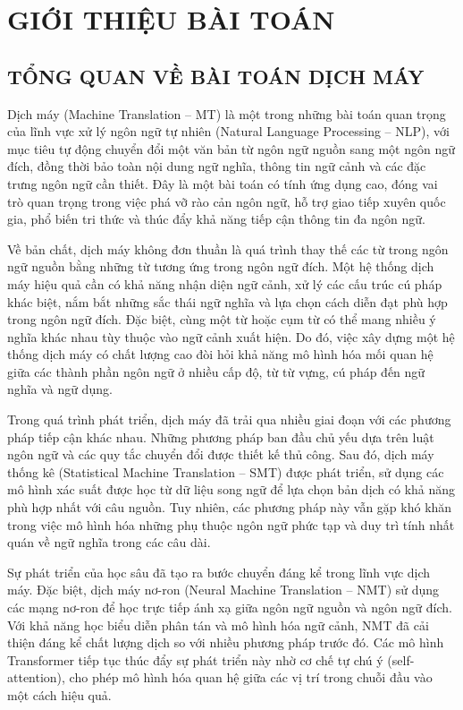 
\section{GIỚI THIỆU BÀI TOÁN}
\label{chap:introduction}

\subsection{TỔNG QUAN VỀ BÀI TOÁN DỊCH MÁY}
\label{sec:machine_translation_overview}

Dịch máy (Machine Translation -- MT) là một trong những bài toán quan trọng của lĩnh vực xử lý ngôn ngữ tự nhiên (Natural Language Processing -- NLP), với mục tiêu tự động chuyển đổi một văn bản từ ngôn ngữ nguồn sang một ngôn ngữ đích, đồng thời bảo toàn nội dung ngữ nghĩa, thông tin ngữ cảnh và các đặc trưng ngôn ngữ cần thiết. Đây là một bài toán có tính ứng dụng cao, đóng vai trò quan trọng trong việc phá vỡ rào cản ngôn ngữ, hỗ trợ giao tiếp xuyên quốc gia, phổ biến tri thức và thúc đẩy khả năng tiếp cận thông tin đa ngôn ngữ.

Về bản chất, dịch máy không đơn thuần là quá trình thay thế các từ trong ngôn ngữ nguồn bằng những từ tương ứng trong ngôn ngữ đích. Một hệ thống dịch máy hiệu quả cần có khả năng nhận diện ngữ cảnh, xử lý các cấu trúc cú pháp khác biệt, nắm bắt những sắc thái ngữ nghĩa và lựa chọn cách diễn đạt phù hợp trong ngôn ngữ đích. Đặc biệt, cùng một từ hoặc cụm từ có thể mang nhiều ý nghĩa khác nhau tùy thuộc vào ngữ cảnh xuất hiện. Do đó, việc xây dựng một hệ thống dịch máy có chất lượng cao đòi hỏi khả năng mô hình hóa mối quan hệ giữa các thành phần ngôn ngữ ở nhiều cấp độ, từ từ vựng, cú pháp đến ngữ nghĩa và ngữ dụng.

Trong quá trình phát triển, dịch máy đã trải qua nhiều giai đoạn với các phương pháp tiếp cận khác nhau. Những phương pháp ban đầu chủ yếu dựa trên luật ngôn ngữ và các quy tắc chuyển đổi được thiết kế thủ công. Sau đó, dịch máy thống kê (Statistical Machine Translation -- SMT) được phát triển, sử dụng các mô hình xác suất được học từ dữ liệu song ngữ để lựa chọn bản dịch có khả năng phù hợp nhất với câu nguồn. Tuy nhiên, các phương pháp này vẫn gặp khó khăn trong việc mô hình hóa những phụ thuộc ngôn ngữ phức tạp và duy trì tính nhất quán về ngữ nghĩa trong các câu dài.

Sự phát triển của học sâu đã tạo ra bước chuyển đáng kể trong lĩnh vực dịch máy. Đặc biệt, dịch máy nơ-ron (Neural Machine Translation -- NMT) sử dụng các mạng nơ-ron để học trực tiếp ánh xạ giữa ngôn ngữ nguồn và ngôn ngữ đích. Với khả năng học biểu diễn phân tán và mô hình hóa ngữ cảnh, NMT đã cải thiện đáng kể chất lượng dịch so với nhiều phương pháp trước đó. Các mô hình Transformer tiếp tục thúc đẩy sự phát triển này nhờ cơ chế tự chú ý (self-attention), cho phép mô hình hóa quan hệ giữa các vị trí trong chuỗi đầu vào một cách hiệu quả.

